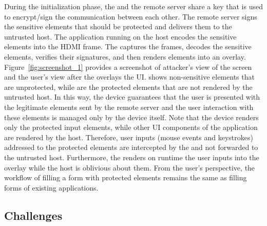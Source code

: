 During the initialization phase, the \device and the remote server share a key that is used to encrypt/sign the communication between each other. The remote server signs the sensitive elements that should be protected and delivers them to the untrusted host. The application running on the host encodes the sensitive elements into the HDMI frame. The \device captures the frames, decodes the sensitive elements, verifies their signatures, and then renders elements into an overlay. Figure~\ref{fig:screenshot_1} provides a screenshot of attacker's view of the screen and the user's view after the \device overlays the UI. \one shows non-sensitive elements that are unprotected, while \two are the protected elements that are not rendered by the untrusted host. In this way, the device guarantees that the user is presented with the legitimate elements sent by the remote server and the user interaction with these elements is managed only by the device itself. Note that the device renders only the protected input elements, while other UI components of the application are rendered by the host. 
Therefore, user inputs (mouse events and keystrokes) addressed to the protected elements are intercepted by the \device and not forwarded to the untrusted host. Furthermore, the \device renders on runtime the user inputs into the overlay while the host is oblivious about them. From the user's perspective, the workflow of filling a form with protected elements remains the same as filling forms of existing applications.


\subsection{Challenges}


